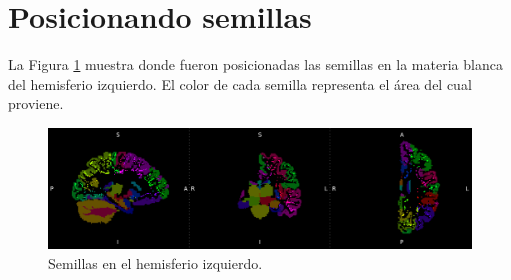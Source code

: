 \section{Posicionando semillas}

La Figura \ref{fig:semillas} muestra donde fueron posicionadas las semillas en
la materia blanca del hemisferio izquierdo. El color de cada semilla representa
el \'area del cual proviene.

\begin{figure}[h!]
   \centering
    \includegraphics[width=\textwidth]{img/painted_seeds.png}
    \caption{Semillas en el hemisferio izquierdo. }
    \label{fig:semillas}
\end{figure}

